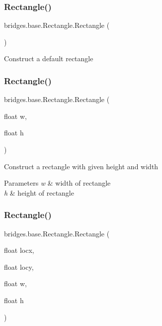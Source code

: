 \subsubsection{\texorpdfstring{Rectangle()}{Rectangle()}\hspace{0.1cm}{\footnotesize\ttfamily [1/3]}}
{\footnotesize\ttfamily bridges.\+base.\+Rectangle.\+Rectangle (\begin{DoxyParamCaption}{ }\end{DoxyParamCaption})}

Construct a default rectangle \mbox{\label{classbridges_1_1base_1_1_rectangle_ae23e33dbe811d3f49b542b02d1800952}} 
\subsubsection{\texorpdfstring{Rectangle()}{Rectangle()}\hspace{0.1cm}{\footnotesize\ttfamily [2/3]}}
{\footnotesize\ttfamily bridges.\+base.\+Rectangle.\+Rectangle (\begin{DoxyParamCaption}\item[{float}]{w,  }\item[{float}]{h }\end{DoxyParamCaption})}

Construct a rectangle with given height and width 
\begin{DoxyParams}{Parameters}
{\em w} & width of rectangle \\
\hline
{\em h} & height of rectangle \\
\hline
\end{DoxyParams}
\mbox{\label{classbridges_1_1base_1_1_rectangle_a4df21db188c66f5635191f306a29c7e3}} 
\subsubsection{\texorpdfstring{Rectangle()}{Rectangle()}\hspace{0.1cm}{\footnotesize\ttfamily [3/3]}}
{\footnotesize\ttfamily bridges.\+base.\+Rectangle.\+Rectangle (\begin{DoxyParamCaption}\item[{float}]{locx,  }\item[{float}]{locy,  }\item[{float}]{w,  }\item[{float}]{h }\end{DoxyParamCaption})}

